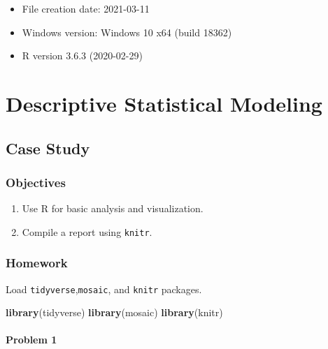 \documentclass[
]{book}
\newenvironment{Shaded}{\begin{snugshade}}{\end{snugshade}}
\newcommand{\KeywordTok}[1]{\textcolor[rgb]{0.13,0.29,0.53}{\textbf{#1}}}
\newcommand{\NormalTok}[1]{#1}
\providecommand{\tightlist}{%
  \setlength{\itemsep}{0pt}\setlength{\parskip}{0pt}}
\begin{document}
\begin{itemize}
\tightlist
\item
  File creation date: 2021-03-11
\item
  Windows version: Windows 10 x64 (build 18362)
\item
  R version 3.6.3 (2020-02-29)
\end{itemize}

\hypertarget{part-descriptive-statistical-modeling}{%
\part{Descriptive Statistical Modeling}\label{part-descriptive-statistical-modeling}}

\hypertarget{CS1}{%
\chapter{Case Study}\label{CS1}}

\hypertarget{objectives}{%
\section{Objectives}\label{objectives}}

\begin{enumerate}
\def\labelenumi{\arabic{enumi})}
\tightlist
\item
  Use R for basic analysis and visualization.\\
\item
  Compile a report using \texttt{knitr}.
\end{enumerate}

\hypertarget{homework}{%
\section{Homework}\label{homework}}

Load \texttt{tidyverse},\texttt{mosaic}, and \texttt{knitr} packages.

\begin{Shaded}
\begin{Highlighting}[]
\KeywordTok{library}\NormalTok{(tidyverse)}
\KeywordTok{library}\NormalTok{(mosaic)}
\KeywordTok{library}\NormalTok{(knitr)}
\end{Highlighting}
\end{Shaded}

\hypertarget{problem-1}{%
\subsection{Problem 1}\label{problem-1}}
\end{document}
